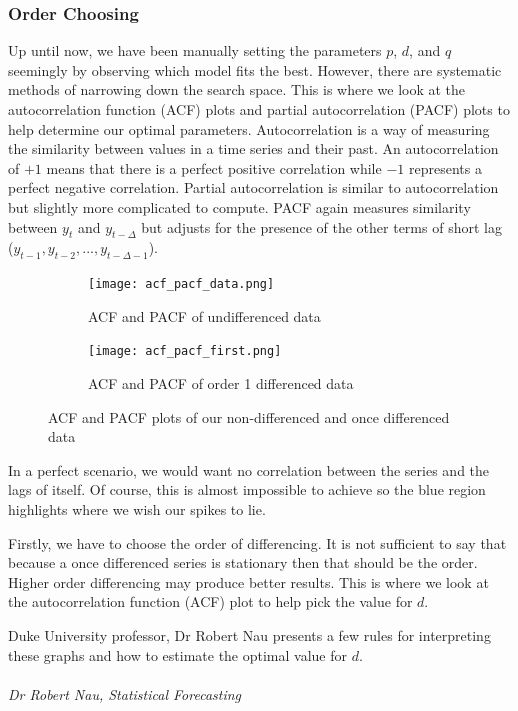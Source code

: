 \documentclass{article}
\begin{document}
  \subsubsection{Order Choosing}
  Up until now, we have been manually setting the parameters $p$, $d$, and $q$ seemingly by observing which model fits the best. However, there are systematic methods of narrowing down the search space. This is where we look at the autocorrelation function (ACF) plots and partial autocorrelation (PACF) plots to help determine our optimal parameters. Autocorrelation is a way of measuring the similarity between values in a time series and their past. An autocorrelation of $+1$ means that there is a perfect positive correlation while $-1$ represents a perfect negative correlation. Partial autocorrelation is similar to autocorrelation but slightly more complicated to compute. PACF again measures similarity between $y_t$ and $y_{t-\Delta}$ but adjusts for the presence of the other terms of short lag ($y_{t-1}, y_{t-2},...,y_{t-\Delta-1}$).

  \begin{figure}[H]
    \centering
    \captionsetup{justification=centering}
    \begin{subfigure}[b]{\linewidth}
      \texttt{[image: acf\_pacf\_data.png]}
      \caption{ACF and PACF of undifferenced data}
    \end{subfigure}
    \begin{subfigure}[b]{\linewidth}
      \texttt{[image: acf\_pacf\_first.png]}
      \caption{ACF and PACF of order 1 differenced data}
    \end{subfigure}
    \caption{ACF and PACF plots of our non-differenced and once differenced data}
  \end{figure}

  In a perfect scenario, we would want no correlation between the series and the lags of itself. Of course, this is almost impossible to achieve so the blue region highlights where we wish our spikes to lie. 

  Firstly, we have to choose the order of differencing. It is not sufficient to say that because a once differenced series is stationary then that should be the order. Higher order differencing may produce better results. This is where we look at the autocorrelation function (ACF) plot to help pick the value for $d$. 

  Duke University professor, Dr Robert Nau presents a few rules for interpreting these graphs and how to estimate the optimal value for $d$.
  \newline
  \newline
  \emph{\\
  \\
  Dr Robert Nau, Statistical Forecasting}
  \newline
\end{document}

